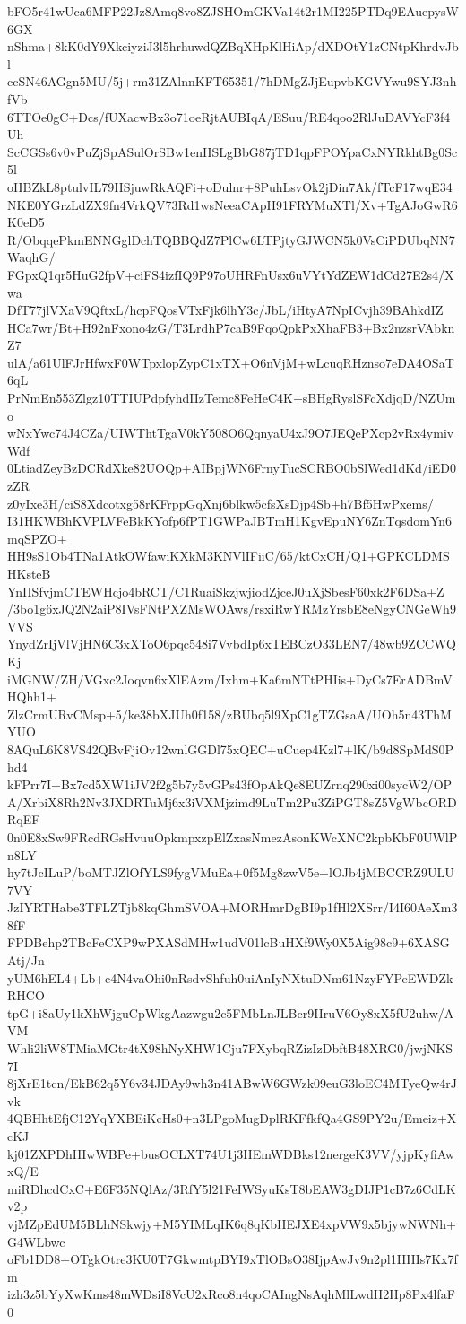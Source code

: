 bFO5r41wUca6MFP22Jz8Amq8vo8ZJSHOmGKVa14t2r1MI225PTDq9EAuepysW6GX
nShma+8kK0dY9XkciyziJ3l5hrhuwdQZBqXHpKlHiAp/dXDOtY1zCNtpKhrdvJbl
ccSN46AGgn5MU/5j+rm31ZAlnnKFT65351/7hDMgZJjEupvbKGVYwu9SYJ3nhfVb
6TTOe0gC+Dcs/fUXacwBx3o71oeRjtAUBIqA/ESuu/RE4qoo2RlJuDAVYcF3f4Uh
ScCGSs6v0vPuZjSpASulOrSBw1enHSLgBbG87jTD1qpFPOYpaCxNYRkhtBg0Sc5l
oHBZkL8ptulvIL79HSjuwRkAQFi+oDulnr+8PuhLsvOk2jDin7Ak/fTcF17wqE34
NKE0YGrzLdZX9fn4VrkQV73Rd1wsNeeaCApH91FRYMuXTl/Xv+TgAJoGwR6K0eD5
R/ObqqePkmENNGglDchTQBBQdZ7PlCw6LTPjtyGJWCN5k0VsCiPDUbqNN7WaqhG/
FGpxQ1qr5HuG2fpV+ciFS4izfIQ9P97oUHRFnUsx6uVYtYdZEW1dCd27E2s4/Xwa
DfT77jlVXaV9QftxL/hcpFQosVTxFjk6lhY3c/JbL/iHtyA7NpICvjh39BAhkdIZ
HCa7wr/Bt+H92nFxono4zG/T3LrdhP7caB9FqoQpkPxXhaFB3+Bx2nzsrVAbknZ7
ulA/a61UlFJrHfwxF0WTpxlopZypC1xTX+O6nVjM+wLcuqRHznso7eDA4OSaT6qL
PrNmEn553Zlgz10TTIUPdpfyhdIIzTemc8FeHeC4K+sBHgRyslSFcXdjqD/NZUmo
wNxYwc74J4CZa/UIWThtTgaV0kY508O6QqnyaU4xJ9O7JEQePXcp2vRx4ymivWdf
0LtiadZeyBzDCRdXke82UOQp+AIBpjWN6FrnyTucSCRBO0bSlWed1dKd/iED0zZR
z0yIxe3H/ciS8Xdcotxg58rKFrppGqXnj6blkw5cfsXsDjp4Sb+h7Bf5HwPxems/
I31HKWBhKVPLVFeBkKYofp6fPT1GWPaJBTmH1KgvEpuNY6ZnTqsdomYn6mqSPZO+
HH9sS1Ob4TNa1AtkOWfawiKXkM3KNVlIFiiC/65/ktCxCH/Q1+GPKCLDMSHKsteB
YnIISfvjmCTEWHcjo4bRCT/C1RuaiSkzjwjiodZjceJ0uXjSbesF60xk2F6DSa+Z
/3bo1g6xJQ2N2aiP8IVsFNtPXZMsWOAws/rsxiRwYRMzYrsbE8eNgyCNGeWh9VVS
YnydZrIjVlVjHN6C3xXToO6pqc548i7VvbdIp6xTEBCzO33LEN7/48wb9ZCCWQKj
iMGNW/ZH/VGxc2Joqvn6xXlEAzm/Ixhm+Ka6mNTtPHIis+DyCs7ErADBmVHQhh1+
ZlzCrmURvCMsp+5/ke38bXJUh0f158/zBUbq5l9XpC1gTZGsaA/UOh5n43ThMYUO
8AQuL6K8VS42QBvFjiOv12wnlGGDl75xQEC+uCuep4Kzl7+lK/b9d8SpMdS0Phd4
kFPrr7I+Bx7cd5XW1iJV2f2g5b7y5vGPs43fOpAkQe8EUZrnq290xi00sycW2/OP
A/XrbiX8Rh2Nv3JXDRTuMj6x3iVXMjzimd9LuTm2Pu3ZiPGT8sZ5VgWbcORDRqEF
0n0E8xSw9FRcdRGsHvuuOpkmpxzpElZxasNmezAsonKWcXNC2kpbKbF0UWlPn8LY
hy7tJcILuP/boMTJZlOfYLS9fygVMuEa+0f5Mg8zwV5e+lOJb4jMBCCRZ9ULU7VY
JzIYRTHabe3TFLZTjb8kqGhmSVOA+MORHmrDgBI9p1fHl2XSrr/I4I60AeXm38fF
FPDBehp2TBcFeCXP9wPXASdMHw1udV01lcBuHXf9Wy0X5Aig98c9+6XASGAtj/Jn
yUM6hEL4+Lb+c4N4vaOhi0nRsdvShfuh0uiAnIyNXtuDNm61NzyFYPeEWDZkRHCO
tpG+i8aUy1kXhWjguCpWkgAazwgu2c5FMbLnJLBcr9IIruV6Oy8xX5fU2uhw/AVM
Whli2liW8TMiaMGtr4tX98hNyXHW1Cju7FXybqRZizIzDbftB48XRG0/jwjNKS7I
8jXrE1tcn/EkB62q5Y6v34JDAy9wh3n41ABwW6GWzk09euG3loEC4MTyeQw4rJvk
4QBHhtEfjC12YqYXBEiKcHs0+n3LPgoMugDplRKFfkfQa4GS9PY2u/Emeiz+XcKJ
kj01ZXPDhHIwWBPe+busOCLXT74U1j3HEmWDBks12nergeK3VV/yjpKyfiAwxQ/E
miRDhcdCxC+E6F35NQlAz/3RfY5l21FeIWSyuKsT8bEAW3gDIJP1cB7z6CdLKv2p
vjMZpEdUM5BLhNSkwjy+M5YIMLqIK6q8qKbHEJXE4xpVW9x5bjywNWNh+G4WLbwc
oFb1DD8+OTgkOtre3KU0T7GkwmtpBYI9xTlOBsO38IjpAwJv9n2pl1HHIs7Kx7fm
izh3z5bYyXwKms48mWDsiI8VcU2xRco8n4qoCAIngNsAqhMlLwdH2Hp8Px4lfaF0
